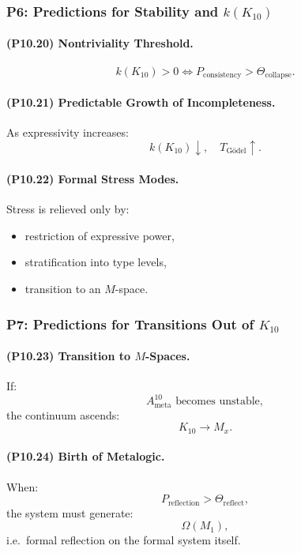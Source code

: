 \subsubsection{P6: Predictions for Stability and $k(K_{10})$}

\paragraph{(P10.20) Nontriviality Threshold.}
\[
k(K_{10}) > 0
\iff
P_{\mathrm{consistency}} > \Theta_{\mathrm{collapse}}.
\]

\paragraph{(P10.21) Predictable Growth of Incompleteness.}
As expressivity increases:
\[
k(K_{10}) \downarrow,
\quad 
T_{\mathrm{Gödel}} \uparrow.
\]

\paragraph{(P10.22) Formal Stress Modes.}
Stress is relieved only by:
\begin{itemize}
    \item restriction of expressive power,
    \item stratification into type levels,
    \item transition to an $M$-space.
\end{itemize}

\subsubsection{P7: Predictions for Transitions Out of $K_{10}$}

\paragraph{(P10.23) Transition to \texorpdfstring{$M$}{M}-Spaces.}
If:
\[
A_{\mathrm{meta}}^{10} \text{ becomes unstable},
\]
the continuum ascends:
\[
K_{10} \to M_x.
\]

\paragraph{(P10.24) Birth of Metalogic.}
When:
\[
P_{\mathrm{reflection}} > \Theta_{\mathrm{reflect}},
\]
the system must generate:
\[
\Omega(M_1),
\]
i.e.\ formal reflection on the formal system itself.

